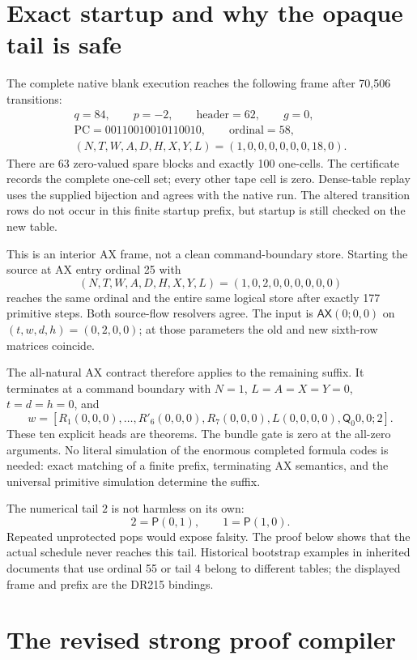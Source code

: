 \documentclass[11pt,a4paper]{article}
\theoremstyle{definition}
\newcommand{\pair}{\mathsf P}
\newcommand{\qnt}{\mathsf Q}
\newcommand{\AX}{\mathsf{AX}}
\numberwithin{equation}{section}
\begin{document}
\section{Exact startup and why the opaque tail is safe}
\label{sec:startup}

The complete native blank execution reaches the following frame after
70,506 transitions:
\[
\begin{gathered}
 q=84,\qquad p=-2,\qquad\mathrm{header}=62,\qquad g=0,\\
 \mathrm{PC}=00110010010110010,\qquad\mathrm{ordinal}=58,\\
 (N,T,W,A,D,H,X,Y,L)=(1,0,0,0,0,0,0,18,0).
\end{gathered}
\]
There are 63 zero-valued spare blocks and exactly 100 one-cells. The
certificate records the complete one-cell set; every other tape cell is
zero. Dense-table replay uses the supplied bijection and agrees with the
native run. The altered transition rows do not occur in this finite
startup prefix, but startup is still checked on the new table.

This is an interior AX frame, not a clean command-boundary store.
Starting the source at AX entry ordinal 25 with
\[
 (N,T,W,A,D,H,X,Y,L)=(1,0,2,0,0,0,0,0,0)
\]
reaches the same ordinal and the entire same logical store after exactly
177 primitive steps. Both source-flow resolvers agree. The input is
$\AX(0;0,0)$ on $(t,w,d,h)=(0,2,0,0)$; at those parameters the old and
new sixth-row matrices coincide.

The all-natural AX contract therefore applies to the remaining suffix.
It terminates at a command boundary with $N=1$, $L=A=X=Y=0$,
$t=d=h=0$, and
\[
 w=[R_1(0,0,0),\ldots,R'_6(0,0,0),R_7(0,0,0),
       L(0,0,0,0),\qnt_0 0,0;2].
\]
These ten explicit heads are theorems. The bundle gate is zero at the
all-zero arguments. No literal simulation of the enormous completed
formula codes is needed: exact matching of a finite prefix, terminating
AX semantics, and the universal primitive simulation determine the suffix.

The numerical tail $2$ is not harmless on its own:
\[
 2=\pair(0,1),\qquad1=\pair(1,0).
\]
Repeated unprotected pops would expose falsity. The proof below shows
that the actual schedule never reaches this tail. Historical bootstrap
examples in inherited documents that use ordinal 55 or tail 4 belong to
different tables; the displayed frame and prefix are the DR215 bindings.

\section{The revised strong proof compiler}
\label{sec:compiler}
\end{document}
